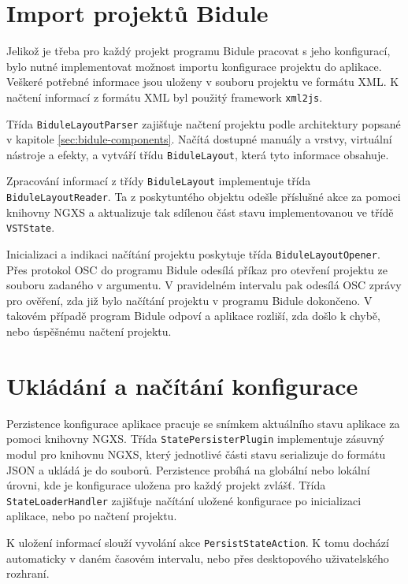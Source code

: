 \documentclass[thesis=M,czech]{FITthesis}[2019/03/06]
\begin{document}
		\section{Import projektů Bidule}
			Jelikož je třeba pro každý projekt programu Bidule pracovat s jeho konfigurací, bylo nutné implementovat možnost importu konfigurace projektu do aplikace. Veškeré potřebné informace jsou uloženy v souboru projektu ve formátu XML. K načtení
			informací z formátu XML byl použitý framework \texttt{xml2js}. 
			
			Třída \texttt{Bidule\-Layout\-Parser} zajišťuje načtení projektu podle architektury popsané v kapitole \ref{sec:bidule-components}.
			Načítá dostupné manuály a vrstvy, virtuální nástroje a efekty,
			a vytváří třídu \texttt{BiduleLayout}, která tyto informace obsahuje.
			
			Zpracování informací z třídy \texttt{BiduleLayout} implementuje třída \texttt{Bidule\-Layou\-tReader}.
			Ta z poskytuntého objektu odešle příslušné akce za pomoci knihovny NGXS a aktualizuje tak sdílenou část stavu implementovanou ve třídě \texttt{VSTState}.
			
			Inicializaci a indikaci načítání projektu poskytuje třída \texttt{Bidule\-Layout\-Opener}. Přes protokol OSC do programu Bidule odesílá příkaz pro otevření projektu ze souboru zadaného v argumentu. V pravidelném intervalu pak odesílá OSC zprávy pro ověření, zda již bylo načítání projektu v programu Bidule dokončeno. V takovém případě program Bidule odpoví a aplikace rozliší, zda došlo k chybě, nebo úspěšnému načtení projektu.			

		\section{Ukládání a načítání konfigurace}
			Perzistence konfigurace aplikace pracuje se snímkem aktuálního stavu aplikace za pomoci knihovny NGXS.
			Třída \texttt{State\-Persister\-Plugin} implementuje zásuvný modul pro knihovnu NGXS, který jednotlivé části stavu serializuje do formátu JSON a ukládá je do souborů. Perzistence probíhá na globální nebo lokální úrovni, kde je konfigurace uložena pro každý projekt zvlášť. Třída \texttt{State\-Loader\-Handler} zajišťuje načítání uložené konfigurace po inicializaci aplikace, nebo po načtení projektu.
			
			K uložení informací slouží vyvolání akce \texttt{Persist\-State\-Action}. K tomu dochází automaticky v daném časovém intervalu, nebo přes desktopového uživatelského rozhraní.
\end{document}
